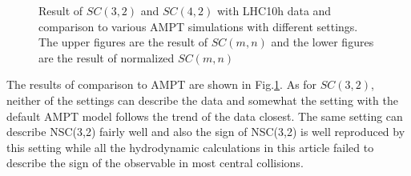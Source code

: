 \begin{figure}[!p]
\begin{center}
        \caption{Result of  $SC(3,2)$ and $SC(4,2)$ with LHC10h data and comparison to various AMPT simulations with different settings.  The upper figures are the result of $SC(m,n)$ and the lower figures are the result of normalized $SC(m,n)$}
        \label{AMPTcomLowSC}
        \end{center}   
     \end{figure}

The results of comparison to AMPT are shown in Fig.\ref{AMPTcomLowSC}. As for $SC(3,2)$, neither of the settings can describe the data and somewhat the setting with the default AMPT model follows the trend of the data closest. The same setting can describe NSC(3,2) fairly well and also the sign of NSC(3,2) is well reproduced by this setting while all the hydrodynamic calculations in this article failed to describe the sign of the observable in most central collisions.


